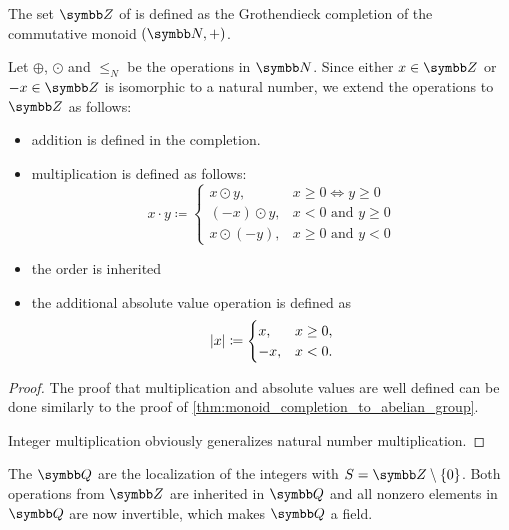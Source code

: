 \begin{definition}\label{def:integers}
  The set \( \Z \) of  is defined as the Grothendieck completion of the commutative monoid \( (\BB{N}, +) \).

  Let \( \oplus \), \( \odot \) and \( \leq_N \) be the operations in \( \BB{N} \). Since either \( x \in \Z \) or \( -x \in \Z \) is isomorphic to a natural number, we extend the operations to \( \Z \) as follows:
  \begin{itemize}
    \item addition is defined in the completion.
    \item multiplication is defined as follows:
    \begin{equation*}
      x \cdot y \coloneqq \begin{cases}
        x \odot y, & x \geq 0 \iff y \geq 0 \\
        (-x) \odot y, & x < 0 \text{ and } y \geq 0 \\
        x \odot (-y), & x \geq 0 \text{ and } y < 0
      \end{cases}
    \end{equation*}

    \item the order is inherited
    \item the additional absolute value operation is defined as
    \begin{equation*}
      \left\vert x \right\vert \coloneqq \begin{cases}
        x, &x \geq 0, \\
        -x, &x < 0.
      \end{cases}
    \end{equation*}
  \end{itemize}
\end{definition}
\begin{proof}
  The proof that multiplication and absolute values are well defined can be done similarly to the proof of \cref{thm:monoid_completion_to_abelian_group}.

  Integer multiplication obviously generalizes natural number multiplication.
\end{proof}

\begin{definition}\label{def:rational_numbers}
  The  \( \Q \) are the localization of the integers with \( S = \Z \setminus \{ 0 \} \). Both operations from \( \Z \) are inherited in \( \Q \) and all nonzero elements in \( \Q \) are now invertible, which makes \( \Q \) a field.
\end{definition}

